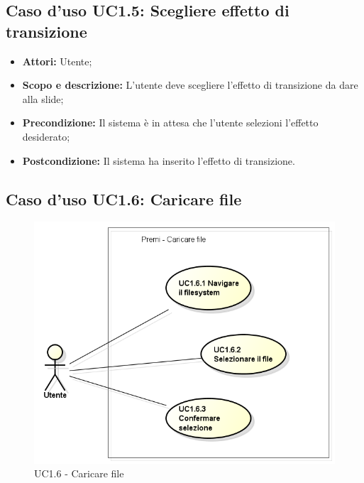 \subsection{Caso d'uso UC1.5: Scegliere effetto di transizione}
\begin{itemize}
	\item \textbf{Attori:} Utente;
	\item \textbf{Scopo e descrizione:} L'utente deve scegliere l'effetto di transizione da dare alla slide;
	\item \textbf{Precondizione:} Il sistema è in attesa che l'utente selezioni l'effetto desiderato;
	\item \textbf{Postcondizione:} Il sistema ha inserito l'effetto di transizione.
\end{itemize}

\subsection{Caso d'uso UC1.6: Caricare file}
\begin{figure}[h] 
	\centering 
	\includegraphics[scale=0.45] {img/UC1.6.png} 
	\caption{UC1.6 - Caricare file} 
\end{figure}

